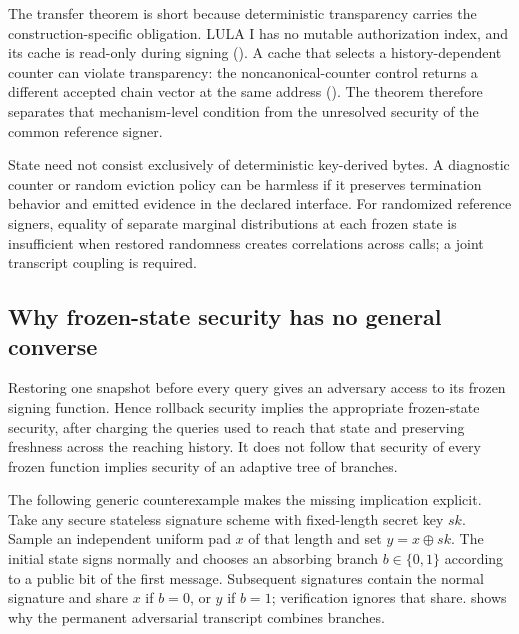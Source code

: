 \documentclass[a4paper,envcountsame,runningheads]{llncs}
\begin{document}
The transfer theorem is short because deterministic transparency carries the construction-specific obligation. LULA I has no mutable authorization index, and its cache is read-only during signing (). A cache that selects a history-dependent counter can violate transparency: the noncanonical-counter control returns a different accepted chain vector at the same address (). The theorem therefore separates that mechanism-level condition from the unresolved security of the common reference signer.

State need not consist exclusively of deterministic key-derived bytes. A diagnostic counter or random eviction policy can be harmless if it preserves termination behavior and emitted evidence in the declared interface. For randomized reference signers, equality of separate marginal distributions at each frozen state is insufficient when restored randomness creates correlations across calls; a joint transcript coupling is required.

\subsection{Why frozen-state security has no general converse}
Restoring one snapshot before every query gives an adversary access to its frozen signing function. Hence rollback security implies the appropriate frozen-state security, after charging the queries used to reach that state and preserving freshness across the reaching history. It does not follow that security of every frozen function implies security of an adaptive tree of branches.

The following generic counterexample makes the missing implication explicit. Take any secure stateless signature scheme with fixed-length secret key $sk$. Sample an independent uniform pad $x$ of that length and set $y=x\oplus sk$. The initial state signs normally and chooses an absorbing branch $b\in\{0,1\}$ according to a public bit of the first message. Subsequent signatures contain the normal signature and share $x$ if $b=0$, or $y$ if $b=1$; verification ignores that share.  shows why the permanent adversarial transcript combines branches.
\end{document}

